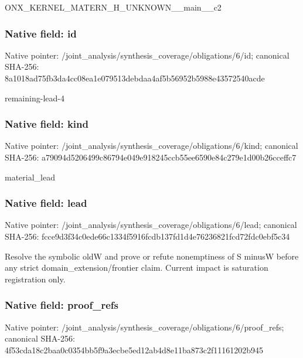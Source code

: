 \documentclass[10pt,a4paper]{article}
\begin{document}
\begingroup\raggedright\sloppy ONX\_\allowbreak{}KERNEL\_\allowbreak{}MATERN\_\allowbreak{}H\_\allowbreak{}UNKNOWN\_\allowbreak{}\_\allowbreak{}main\_\allowbreak{}\_\allowbreak{}c2\par\endgroup

\subsubsection{Native field: id}
Native pointer: /joint\_\allowbreak{}analysis/synthesis\_\allowbreak{}coverage/obligations/6/id; canonical SHA-256: 8a1018ad75fb3da4cc08ea1e079513debdaa4af5b56952b5988e43572540acde

\begingroup\raggedright\sloppy remaining-lead-4\par\endgroup

\subsubsection{Native field: kind}
Native pointer: /joint\_\allowbreak{}analysis/synthesis\_\allowbreak{}coverage/obligations/6/kind; canonical SHA-256: a79094d5206499c86794e049e918245ccb55ee6590e84c279e1d00b26cceffc7

\begingroup\raggedright\sloppy material\_\allowbreak{}lead\par\endgroup

\subsubsection{Native field: lead}
Native pointer: /joint\_\allowbreak{}analysis/synthesis\_\allowbreak{}coverage/obligations/6/lead; canonical SHA-256: fcce9d3f34c0ede66c1334f5916fcdb137fd1d4e76236821fcd72fdc0ebf5c34

\begingroup\raggedright\sloppy Resolve the symbolic oldW and prove or refute nonemptiness of S minusW before any strict domain\_\allowbreak{}extension/\allowbreak{}frontier claim. Current impact is saturation registration only.\par\endgroup

\subsubsection{Native field: proof\_\allowbreak{}refs}
Native pointer: /joint\_\allowbreak{}analysis/synthesis\_\allowbreak{}coverage/obligations/6/proof\_\allowbreak{}refs; canonical SHA-256: 4f53cda18c2baa0c0354bb5f9a3ecbe5ed12ab4d8e11ba873c2f11161202b945
\end{document}
